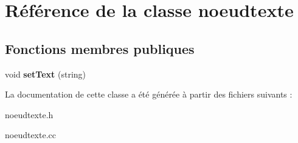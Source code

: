 \hypertarget{classnoeudtexte}{
\section{Référence de la classe noeudtexte}
\label{classnoeudtexte}
}
\subsection*{Fonctions membres publiques}
\begin{DoxyCompactItemize}
\item 
\hypertarget{classnoeudtexte_a0418b6a301c85c8c0a0f2b7fb293ba47}{
void {\bfseries setText} (string)}
\label{classnoeudtexte_a0418b6a301c85c8c0a0f2b7fb293ba47}

\end{DoxyCompactItemize}


La documentation de cette classe a été générée à partir des fichiers suivants :\begin{DoxyCompactItemize}
\item 
noeudtexte.h\item 
noeudtexte.cc\end{DoxyCompactItemize}
